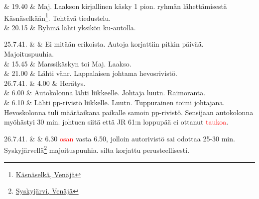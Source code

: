 \documentclass[11pt,a5paper,oneside]{book}
\begin{document}
& 19.40 & Maj. Laakson kirjallinen käsky 1 pion. ryhmän lähettämisestä Käsnäselkään\footnote{\href{https://www.google.fi/maps/place/Derevnya+Kyasnyasel'kya,+Republic+of+Karelia,+Russia,+186148/}{Käsnäselkä, Venäjä}}. Tehtävä tiedustelu. \\

& 20.15 & Ryhmä lähti yksikön ku-autolla. \\
\newpage

25.7.41. & & Ei mitään erikoista. Autoja korjattiin pitkin päivää. \newline Majoituspuuhia. \newline \\

& 15.45 & Marssikäskyn toi Maj. Laakso. \\

& 21.00 & Lähti vänr. Lappalaisen johtama hevosrivistö. \newline\newline\newline\newline\newline\newline\newline \\

26.7.41. & 4.00 & Herätys. \\

& 6.00 & Autokolonna lähti liikkeelle. Johtaja luutn. Raimoranta. \\

& 6.10 & Lähti pp-rivistö liikkelle. Luutn. Tuppurainen toimi johtajana. Hevoskolonna tuli määräaikana paikalle samoin pp-rivistö. Sensijaan autokolonna myöhästyi 30 min. johtuen siitä että JR 61:n loppupää ei ottanut \textcolor{red}{taukoa}. \\

\taulustop


26.7.41. & & 6.30 \textcolor{red}{osan} vasta 6.50, jolloin autorivistö sai odottaa 25-30 min. \newline\newline Syskyjärvellä\footnote{\href{https://www.google.fi/maps/place/Ozero+Syuskyuyarvi/}{Syskyjärvi, Venäjä}} majoituspuuhia.  silta korjattu perusteellisesti. \newline\newline\newline\newline\newline\newline \\
\end{document}
